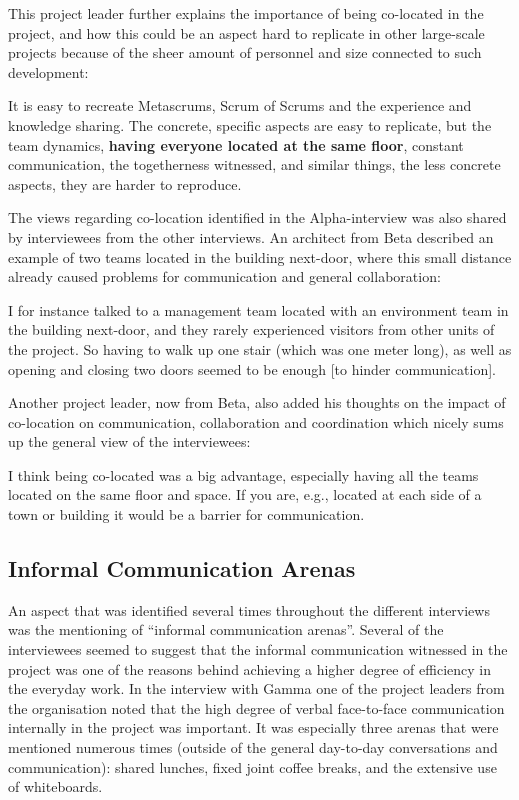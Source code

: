 This project leader further explains the importance of being co-located in the project, and how this could be an aspect hard to replicate in other large-scale projects because of the sheer amount of personnel and size connected to such development:

\begin{fancyquotes}
It is easy to recreate Metascrums, Scrum of Scrums and the experience and knowledge sharing. The concrete, specific aspects are easy to replicate, but the team dynamics, \textbf{having everyone located at the same floor}, constant communication, the togetherness witnessed, and similar things, the less concrete aspects, they are harder to reproduce.
\end{fancyquotes}

The views regarding co-location identified in the Alpha-interview was also shared by interviewees from the other interviews. An architect from Beta described an example of two teams located in the building next-door, where this small distance already caused problems for communication and general collaboration:

\begin{fancyquotes}
I for instance talked to a management team located with an environment team in the building next-door, and they rarely experienced visitors from other units of the project. So having to walk up one stair (which was one meter long), as well as opening and closing two doors seemed to be enough [to hinder communication].
\end{fancyquotes}

Another project leader, now from Beta, also added his thoughts on the impact of co-location on communication, collaboration and coordination which nicely sums up the general view of the interviewees:

\begin{fancyquotes}
I think being co-located was a big advantage, especially having all the teams located on the same floor and space. If you are, e.g., located at each side of a town or building it would be a barrier for communication.
\end{fancyquotes}

\subsection{Informal Communication Arenas}

An aspect that was identified several times throughout the different interviews was the mentioning of ``informal communication arenas''. Several of the interviewees seemed to suggest that the informal communication witnessed in the project was one of the reasons behind achieving a higher degree of efficiency in the everyday work. In the interview with Gamma one of the project leaders from the organisation noted that the high degree of verbal face-to-face communication internally in the project was important. It was especially three arenas that were mentioned numerous times (outside of the general day-to-day conversations and communication): shared lunches, fixed joint coffee breaks, and the extensive use of whiteboards.

